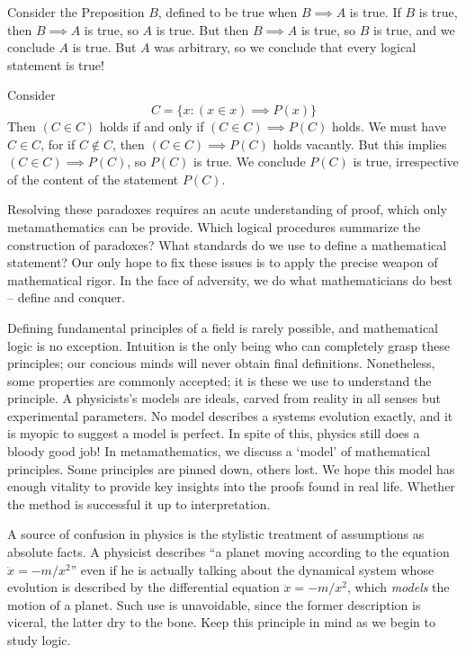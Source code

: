 \begin{example}[L\"{o}b]
    Consider the Preposition $B$, defined to be true when $B \implies A$ is true. If $B$ is true, then $B \implies A$ is true, so $A$ is true. But then $B \implies A$ is true, so $B$ is true, and we conclude $A$ is true. But $A$ was arbitrary, so we conclude that every logical statement is true!
\end{example}

\begin{example}[Curry]
     Consider
    \[ C = \{ x : (x \in x) \implies P(x) \} \]
    Then $(C \in C)$ holds if and only if $(C \in C) \implies P(C)$ holds. We must have $C \in C$, for if $C \not \in C$, then $(C \in C) \implies P(C)$ holds vacantly. But this implies $(C \in C) \implies P(C)$, so $P(C)$ is true. We conclude $P(C)$ is true, irrespective of the content of the statement $P(C)$.
\end{example}

Resolving these paradoxes requires an acute understanding of proof, which only metamathematics can be provide. Which logical procedures summarize the construction of paradoxes? What standards do we use to define a mathematical statement? Our only hope to fix these issues is to apply the precise weapon of mathematical rigor. In the face of adversity, we do what mathematicians do best -- define and conquer.

Defining fundamental principles of a field is rarely possible, and mathematical logic is no exception. Intuition is the only being who can completely grasp these principles; our concious minds will never obtain final definitions. Nonetheless, some properties are commonly accepted; it is these we use to understand the principle. A physicists's models are ideals, carved from reality in all senses but experimental parameters. No model describes a systems evolution exactly, and it is myopic to suggest a model is perfect. In spite of this, physics still does a bloody good job! In metamathematics, we discuss a `model' of mathematical principles. Some principles are pinned down, others lost. We hope this model has enough vitality to provide key insights into the proofs found in real life. Whether the method is successful it up to interpretation.

A source of confusion in physics is the stylistic treatment of assumptions as absolute facts. A physicist describes ``a planet moving according to the equation $\ddot{x} = -m/x^2$'' even if he is actually talking about the dynamical system whose evolution is described by the differential equation $\ddot{x} = -m/x^2$, which {\it models} the motion of a planet. Such use is unavoidable, since the former description is viceral, the latter dry to the bone. Keep this principle in mind as we begin to study logic.

